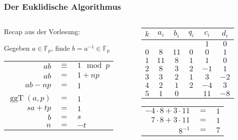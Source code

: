 \documentclass[11pt,aspectratio=169]{beamer}
\begin{document}
	\begin{frame}
		\frametitle{Der Euklidische Algorithmus}
	
	\begin{columns}[t]
	\begin{column}{0.50\textwidth}	
	
	Recap aus der Vorlesung:
	
	Gegeben $a \in \mathbb{F}_p$, finde $b = a^{-1} \in \mathbb{F}_p$
	
	\begin{tabular}{rcl}
		$a  b$ &$\equiv$& $1 \mod p$\\
		$a  b$ &$=$& $1 + n  p$\\
		$a  b - n  p$ &$=$& $1$\\
		&&\\
		$\operatorname{ggT}(a,p)$&$=$& $1$\\
		$sa + tp$&$=$& $1$\\
		$b$&$=$&$s$\\
		$n$&$=$&$-t$
	\end{tabular}
	
	\end{column}
	\begin{column}{0.50\textwidth}	
	
	\begin{center}
	
	\begin{tabular}{| c | c c | c | c c |}
		\hline
		$k$ & $a_i$ & $b_i$ & $q_i$ & $c_i$ & $d_i$\\
		\hline 
		& & & & $1$& $0$\\
		$0$& $8$& $11$& $0$& $0$& $1$\\
		$1$& $11$& $8$& $1$& $1$& $0$\\
		$2$& $8$& $3$& $2$& $-1$& $1$\\
		$3$& $3$& $2$& $1$& $3$& $-2$\\
		$4$& $2$& $1$& $2$& $-4$& $3$\\
		$5$& $1$& $0$& & $11$& $-8$\\
		\hline
	\end{tabular}	
	
	\vspace{10pt}
	
	\begin{tabular}{rcl}
		$-4\cdot 8 + 3 \cdot 11$ &$=$& $1$\\
		$7 \cdot 8 + 3 \cdot 11$ &$=$& $1$\\
		$8^{-1}$ &$=$& $7$
		
	\end{tabular}
	
	\end{center}
	
	\end{column}
	\end{columns}
	
	\end{frame}
\end{document}
